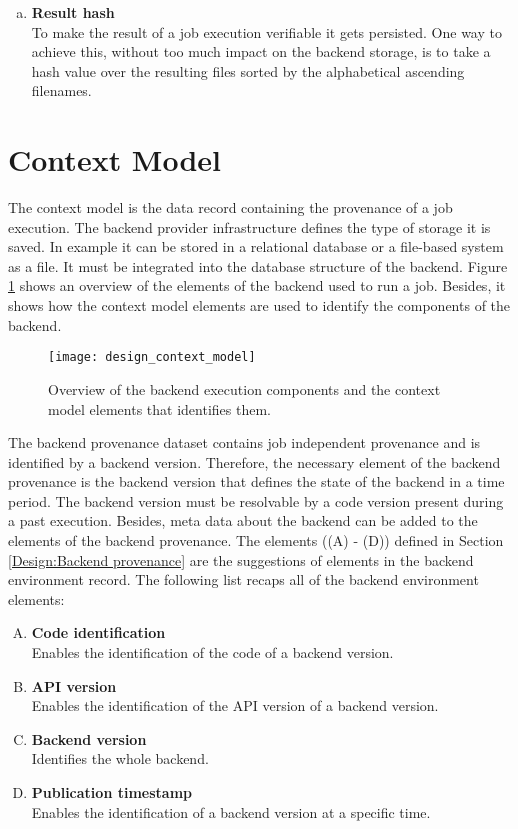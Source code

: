 \documentclass[draft,final]{vutinfth} %
\begin{document}
\begin{enumerate}[(f)]
	\item \textbf{Result hash} \\
	To make the result of a job execution verifiable it gets persisted. One way to achieve this, without too much impact on the backend storage, is to take a hash value over the resulting files sorted by the alphabetical ascending filenames.
\end{enumerate}


\section{Context Model}\label{Design:Context Model}

The context model is the data record containing the provenance of a job execution. The backend provider infrastructure defines the type of storage it is saved. In example it can be stored in a relational database or a file-based system as a file. It must be integrated into the database structure of the backend. Figure \ref{fig:design_contextmodel} shows an overview of the elements of the backend used to run a job. Besides, it shows how the context model elements are used to identify the components of the backend.

\begin{figure}[h]
	\centering
	\texttt{[image: design\_context\_model]}
	\caption{Overview of the backend execution components and the context model elements that identifies them.}
	\label{fig:design_contextmodel} 
\end{figure}

The backend provenance dataset contains job independent provenance and is identified by a backend version. Therefore, the necessary element of the backend provenance is the backend version that defines the state of the backend in a time period. The backend version must be resolvable by a code version present during a past execution. Besides, meta data about the backend can be added to the elements of the backend provenance. The elements ((A) - (D)) defined in Section \ref{Design:Backend provenance} are the suggestions of elements in the backend environment record. The following list recaps all of the backend environment elements: 

\begin{enumerate}[(A)]
	\item \textbf{Code identification} \\
	Enables the identification of the code of a backend version.
	\item \textbf{API version} \\
	Enables the identification of the API version of a backend version.
	\item \textbf{Backend version} \\ 
	Identifies the whole backend.
	\item \textbf{Publication timestamp} \\ 
	Enables the identification of a backend version at a specific time.
\end{enumerate}
\end{document}
